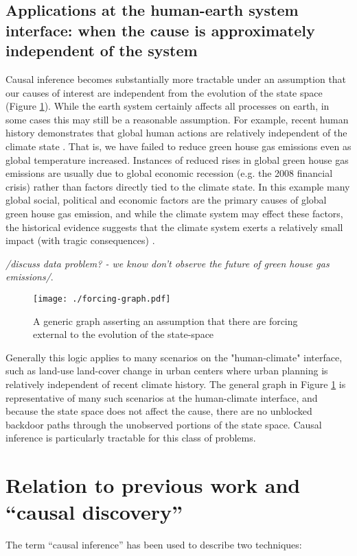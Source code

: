 \documentclass[12pt]{article}
\begin{document}
\subsection{Applications at the human-earth system interface: when the
  cause is approximately independent of the system}
\label{human}

Causal inference becomes substantially more tractable under an
assumption that our causes of interest are independent from the
evolution of the state space (Figure \ref{fig:forcing}). While the
earth system certainly affects all processes on earth, in some cases
this may still be a reasonable assumption. For example, recent human
history demonstrates that global human actions are relatively
independent of the climate state \citep{arto2014drivers}. That is, we
have failed to reduce green house gas emissions even as global
temperature increased. Instances of reduced rises in global green
house gas emissions are usually due to global economic recession
(e.g. the 2008 financial crisis) rather than factors directly tied to
the climate state. In this example many global social, political and
economic factors are the primary causes of global green house gas
emission, and while the climate system may effect these factors, the
historical evidence suggests that the climate system exerts a
relatively small impact (with tragic consequences)
\citep{arto2014drivers}.

\emph{/discuss data problem? - we know
  don't observe the future of green house gas emissions/}.

\begin{figure}
  \texttt{[image: ./forcing-graph.pdf]}
  \caption{A generic graph asserting an assumption that there are
    forcing external to the evolution of the state-space}
  \label{fig:forcing}
\end{figure}

Generally this logic applies to many scenarios on the "human-climate"
interface, such as land-use land-cover change in urban centers where
urban planning is relatively independent of recent climate
history. The general graph in Figure \ref{fig:forcing} is
representative of many such scenarios at the human-climate interface,
and because the state space does not affect the cause, there are no
unblocked backdoor paths through the unobserved portions of the state
space. Causal inference is particularly tractable for this class of
problems.

\section{Relation to previous work and ``causal discovery''}
\label{sec:discovery}
The term ``causal inference'' has been used to describe two
techniques:
\end{document}
